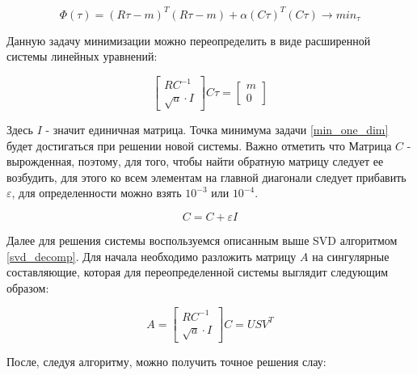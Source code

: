 \documentclass[a4paper,12pt]{diplom}
\renewcommand{\epsilon}{\varepsilon}
\begin{document}
\begin{equation}
 \Phi(\tau)=(R\tau-m)^T (R\tau-m) + \alpha(C\tau)^T(C\tau) \to min_{\tau}
 \label{min_one_dim}
\end{equation}

Данную задачу минимизации можно переопределить в виде расширенной системы линейных уравнений:

\begin{equation}
    \begin{bmatrix}
        RC^{-1} \\
        \sqrt{a} \cdot I
    \end{bmatrix}
    C\tau = 
    \begin{bmatrix}
        m \\
        0
    \end{bmatrix}
    \label{system_one_dim}
\end{equation}

Здесь $I$ - значит единичная матрица. 
Точка минимума задачи \eqref{min_one_dim} будет достигаться при решении новой системы. Важно отметить что Матрица
$C$ - вырожденная, поэтому, для того, чтобы найти обратную матрицу следует ее возбудить, для этого ко всем элементам
на главной диагонали следует прибавить $\epsilon$, для определенности можно взять $10^{-3}$ или $10^{-4}$.

\begin{equation}
   C = C + \epsilon I
\end{equation}

Далее для решения системы воспользуемся описанным выше SVD алгоритмом \eqref{svd_decomp}. Для начала необходимо разложить 
матрицу $A$ на сингулярные составляющие, которая для переопределенной системы выглядит следующим образом:

\begin{equation}
   A =
   \begin{bmatrix}
      RC^{-1} \\
      \sqrt{a} \cdot I
  \end{bmatrix}
  C = USV^{T}
\end{equation}

После, следуя алгоритму, можно получить точное решения слау:
\end{document}
